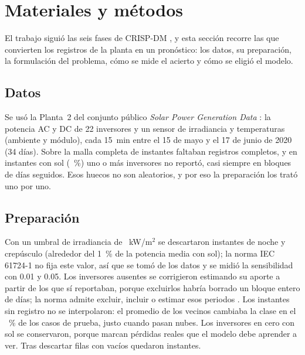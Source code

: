 \documentclass[conference]{IEEEtran}
\begin{document}
\section{Materiales y m\'etodos}
El trabajo sigui\'o las seis fases de CRISP-DM \cite{crispdm}, y esta secci\'on recorre las que convierten los registros de la planta en un pron\'ostico: los datos, su preparaci\'on, la formulaci\'on del problema, c\'omo se mide el acierto y c\'omo se eligi\'o el modelo.

\subsection{Datos}
Se us\'o la Planta~2 del conjunto p\'ublico \emph{Solar Power Generation Data} \cite{kaggle}: la potencia AC y DC de 22 inversores y un sensor de irradiancia y temperaturas (ambiente y m\'odulo), cada 15~min entre el 15 de mayo y el 17 de junio de 2020 (34 d\'ias). Sobre la malla completa de \nesperados{} instantes faltaban \nausentes{} registros completos, y en \nincompletos{} instantes con sol (\pctincompletos{}~\%) uno o m\'as inversores no report\'o, casi siempre en bloques de d\'ias seguidos. Esos huecos no son aleatorios, y por eso la preparaci\'on los trat\'o uno por uno.

\subsection{Preparaci\'on}
Con un umbral de irradiancia de \umbral{}~kW/m$^2$ se descartaron \nnoche{} instantes de noche y crep\'usculo (alrededor del 1~\% de la potencia media con sol); la norma IEC 61724-1 \cite{iec61724} no fija este valor, as\'i que se tom\'o de los datos y se midi\'o la sensibilidad con 0.01 y 0.05. Los inversores ausentes se corrigieron estimando su aporte a partir de los que s\'i reportaban, porque excluirlos habr\'ia borrado un bloque entero de d\'ias; la norma admite excluir, incluir o estimar esos periodos \cite{iec61724}. Los instantes sin registro no se interpolaron: el promedio de los vecinos cambiaba la clase en el \errinterp{}~\% de los casos de prueba, justo cuando pasan nubes. Los inversores en cero con sol se conservaron, porque marcan p\'erdidas reales que el modelo debe aprender a ver. Tras descartar \ndescarte{} filas con vac\'ios quedaron \nfilas{} instantes.
\end{document}
